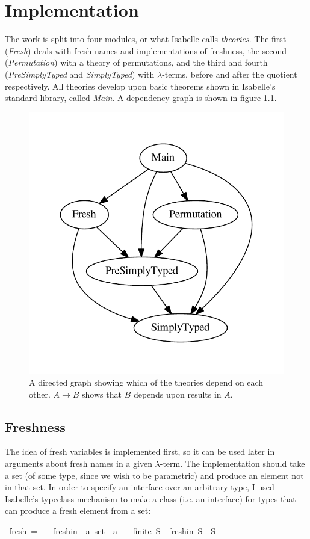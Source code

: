 \chapter{Implementation}
The work is split into four modules, or what Isabelle calls \emph{theories}.
The first (\emph{Fresh}) deals with fresh names and implementations of freshness, the second (\emph{Permutation}) with a theory of permutations, and the third and fourth (\emph{PreSimplyTyped} and \emph{SimplyTyped}) with \(\lambda\)-terms, before and after the quotient respectively.
All theories develop upon basic theorems shown in Isabelle's standard library, called \emph{Main}.
A dependency graph is shown in figure \ref{fig:dependencies}.

\begin{figure}
\centering
\includegraphics[width=.5\textwidth]{chapters/implementation/figures/dependencies}
\caption{A directed graph showing which of the theories depend on each other. \(A \to B\) shows that \(B\) depends upon results in \(A\).}
\label{fig:dependencies}
\end{figure}

\section{Freshness}
The idea of fresh variables is implemented first, so it can be used later in arguments about fresh names in a given \(\lambda\)-term.
The implementation should take a set (of some type, since we wish to be parametric) and produce an element not in that set.
In order to specify an interface over an arbitrary type, I used Isabelle's typeclass mechanism to make a class (i.e. an interface) for types that can produce a fresh element from a set:

\begin{implementation}
\isamarkupfalse%
\ fresh\ =\isanewline
\ \ \ fresh{\isacharunderscore}in\ {\isacharcolon}{\isacharcolon}\ {\isachardoublequoteopen}{\isacharprime}a\ set\ {\isasymRightarrow}\ {\isacharprime}a{\isachardoublequoteclose}\isanewline
\ \ \ {\isachardoublequoteopen}finite\ S\ {\isasymLongrightarrow}\ fresh{\isacharunderscore}in\ S\ {\isasymnotin}\ S{\isachardoublequoteclose}\isanewline
\end{implementation}


